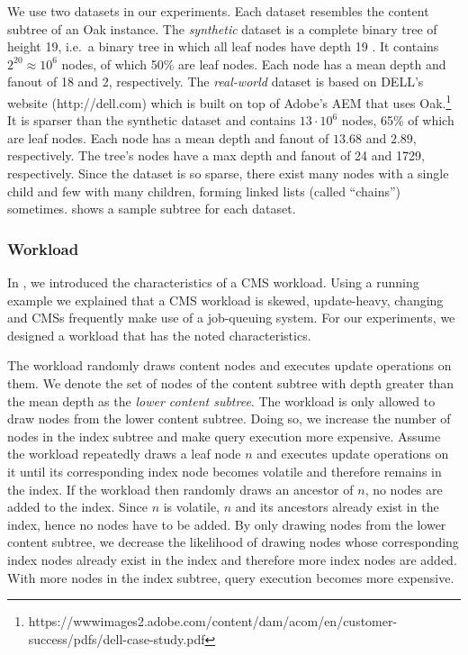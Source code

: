 \documentclass[abstracton,12pt]{scrartcl}
\theoremstyle{definition}
\begin{document}
We use two datasets in our experiments. Each dataset resembles the content
subtree of an Oak instance. The \textit{synthetic} dataset is a complete binary
tree of height 19, i.e.\ a binary tree in which all leaf nodes have depth 19
\cite{Cormen}. It contains $2^{20} \approx 10^6$ nodes, of which 50\% are leaf
nodes. Each node has a mean depth and fanout of 18 and 2, respectively. The
\textit{real-world} dataset is based on DELL's website (http://dell.com)
which is built on top of Adobe's AEM that uses Oak.\footnote{https://wwwimages2.adobe.com/content/dam/acom/en/customer-success/pdfs/dell-case-study.pdf}
It is sparser than the synthetic dataset and contains $13 \cdot 10^6$
nodes, 65\% of which are leaf nodes. Each node has a mean depth and fanout of
$13.68$ and $2.89$, respectively. The tree's nodes have a max depth and fanout of 24
and 1729, respectively. Since the dataset is so sparse, there exist many nodes with 
a single child and few with many children, forming linked lists (called ``chains'')
sometimes.  shows a sample subtree for each dataset.

\vspace{-0.2cm}

\subsubsection{Workload}

\label{sec:workload}

In , we introduced the characteristics of a CMS
workload. Using a running example we explained that a CMS workload is skewed,
update-heavy, changing and CMSs frequently make use of a job-queuing system.
For our experiments, we designed a workload that has the noted characteristics.

The workload randomly draws content nodes and executes update operations on them.
We denote the set of nodes of the content subtree with
depth greater than the mean depth as the \textit{lower content subtree}.
The workload is only allowed to draw nodes from the lower content subtree.
Doing so, we increase the number of nodes in the index subtree and make
query execution more expensive.
Assume the workload repeatedly draws a leaf node $n$ and
executes update operations on it until its corresponding index node
becomes volatile and therefore remains in the index. If the workload
then randomly draws an ancestor of $n$, no nodes are added to the index.
Since $n$ is volatile, $n$ and its ancestors already exist in the index,
hence no nodes have to be added. By only drawing nodes from the lower
content subtree, we decrease the likelihood of drawing nodes whose
corresponding index nodes already exist in the index and therefore
more index nodes are added. With more nodes in the index subtree,
query execution becomes more expensive.
\end{document}
